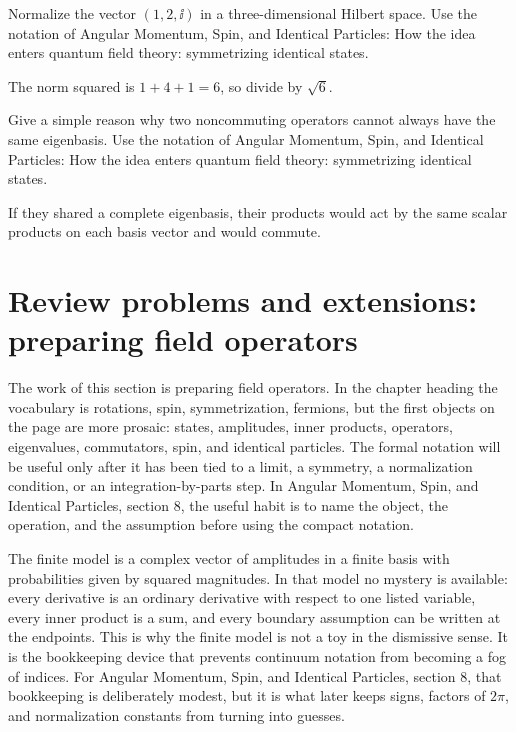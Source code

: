 \begin{exercise}
Normalize the vector \((1,2,\ii)\) in a three-dimensional Hilbert space.  Use the notation of Angular Momentum, Spin, and Identical Particles: How the idea enters quantum field theory: symmetrizing identical states.
\begin{answer}
The norm squared is \(1+4+1=6\), so divide by \(\sqrt6\).
\end{answer}
\end{exercise}

\begin{exercise}
Give a simple reason why two noncommuting operators cannot always have the same eigenbasis.  Use the notation of Angular Momentum, Spin, and Identical Particles: How the idea enters quantum field theory: symmetrizing identical states.
\begin{answer}
If they shared a complete eigenbasis, their products would act by the same scalar products on each basis vector and would commute.
\end{answer}
\end{exercise}



\section{Review problems and extensions: preparing field operators}

The work of this section is preparing field operators.  In the chapter heading the vocabulary is rotations, spin, symmetrization, fermions, but the first objects on the page are more prosaic: states, amplitudes, inner products, operators, eigenvalues, commutators, spin, and identical particles.  The formal notation will be useful only after it has been tied to a limit, a symmetry, a normalization condition, or an integration-by-parts step.  In Angular Momentum, Spin, and Identical Particles, section 8, the useful habit is to name the object, the operation, and the assumption before using the compact notation.

The finite model is a complex vector of amplitudes in a finite basis with probabilities given by squared magnitudes.  In that model no mystery is available: every derivative is an ordinary derivative with respect to one listed variable, every inner product is a sum, and every boundary assumption can be written at the endpoints.  This is why the finite model is not a toy in the dismissive sense.  It is the bookkeeping device that prevents continuum notation from becoming a fog of indices.  For Angular Momentum, Spin, and Identical Particles, section 8, that bookkeeping is deliberately modest, but it is what later keeps signs, factors of \(2\pi\), and normalization constants from turning into guesses.


